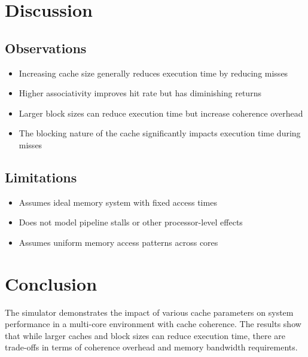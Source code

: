 \documentclass{article}
\begin{document}
\section{Discussion}

\subsection{Observations}
\begin{itemize}
    \item Increasing cache size generally reduces execution time by reducing misses
    \item Higher associativity improves hit rate but has diminishing returns
    \item Larger block sizes can reduce execution time but increase coherence overhead
    \item The blocking nature of the cache significantly impacts execution time during misses
\end{itemize}

\subsection{Limitations}
\begin{itemize}
    \item Assumes ideal memory system with fixed access times
    \item Does not model pipeline stalls or other processor-level effects
    \item Assumes uniform memory access patterns across cores
\end{itemize}

\section{Conclusion}
The simulator demonstrates the impact of various cache parameters on system performance in a multi-core environment with cache coherence. The results show that while larger caches and block sizes can reduce execution time, there are trade-offs in terms of coherence overhead and memory bandwidth requirements.
\end{document}
